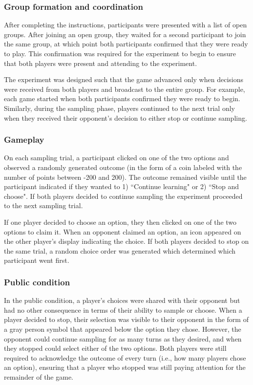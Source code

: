 \documentclass[11pt,jou]{apa6}
\begin{document}
\subsubsection{Group formation and coordination}

After completing the instructions, participants were presented with a list of open groups.
After joining an open group, they waited for a second participant to join the same group, at which point both participants confirmed that they were ready to play.
This confirmation was required for the experiment to begin to ensure that both players were present and attending to the experiment.

The experiment was designed such that the game advanced only when decisions were received from both players and broadcast to the entire group. 
For example, each game started when both participants confirmed they were ready to begin.
Similarly, during the sampling phase, players continued to the next trial only when they received their opponent's decision to either stop or continue sampling.

\subsubsection{Gameplay}

On each sampling trial, a participant clicked on one of the two options and observed a randomly generated outcome (in the form of a coin labeled with the number of points between -200 and 200). 
The outcome remained visible until the participant indicated if they wanted to 1) ``Continue learning" or 2) ``Stop and choose". 
If both players decided to continue sampling the experiment proceeded to the next sampling trial.

If one player decided to choose an option, they then clicked on one of the two options to claim it. 
When an opponent claimed an option, an icon appeared on the other player's display indicating the choice. 
If both players decided to stop on the same trial, a random choice order was generated which determined which participant went first.

\subsubsection{Public condition}

In the public condition, a player's choices were shared with their opponent but had no other consequence in terms of their ability to sample or choose.
When a player decided to stop, their selection was visible to their opponent in the form of a gray person symbol that appeared below the option they chose. 
However, the opponent could continue sampling for as many turns as they desired, and when they stopped could select either of the two options.
Both players were still required to acknowledge the outcome of every turn (i.e., how many players chose an option), ensuring that a player who stopped was still paying attention for the remainder of the game.
\end{document}
